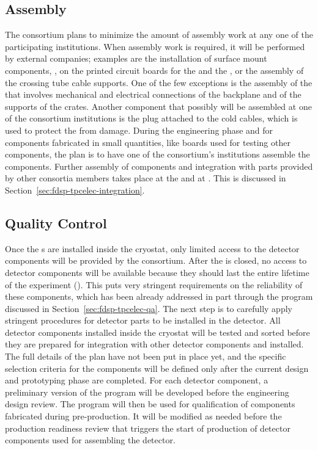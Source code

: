 \subsection{Assembly}
\label{sec:fdsp-tpcelec-production-assembly}

The  consortium plans to minimize
the amount of assembly work at any one of the participating
institutions. When assembly work is required, it will be performed
by external companies; examples are the installation of surface 
mount components, ,  on the printed 
circuit boards for the  and the , or
the assembly of the crossing tube cable supports. One of the few
exceptions is the assembly of the  that involves
mechanical and electrical connections of the backplane and of
the supports of the crates. Another component that possibly 
will be assembled at one of the consortium institutions is
the plug attached to the cold cables, which is used to protect 
the  from  damage. During the engineering
phase and for components fabricated in small quantities, 
like boards used for testing other components, the plan is to
have one of the consortium's institutions assemble the components.
Further assembly of components and integration with parts
provided by other consortia members takes place at the  and
at . This is discussed in Section~\ref{sec:fdsp-tpcelec-integration}.

\subsection{Quality Control}
\label{sec:fdsp-tpcelec-production-qc}

Once the s are installed inside the cryostat, only
limited access to the detector components will be provided by the 
consortium. After the  is closed, no access to detector components will be available because they should
last the entire lifetime of the experiment (\dunelifetime). This
puts very stringent requirements on the reliability of these
components, which has been already addressed in part through 
the  program discussed in Section~\ref{sec:fdsp-tpcelec-qa}. The
next step is to carefully apply stringent  procedures for  
detector parts to be installed in the detector.
All detector components installed inside the cryostat will
be tested and sorted before they are prepared for integration
with other detector components and installed. The full
details of the  plan have not been put in place
yet, and the specific selection criteria for the components will
be defined only after the current design and
prototyping phase are completed. For each detector component, a preliminary
version of the  program will be developed before the engineering design review. The program will then be used for
qualification of components fabricated during 
pre-production. It will be modified as needed before the production
readiness review that triggers the start of production of detector components used for assembling the detector.

